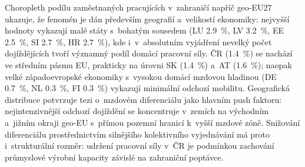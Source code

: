 Choropleth podílu zaměstnaných pracujících v~zahraničí napříč \acs{geo-EU}27 ukazuje, že fenomén je dán především geografií a~velikostí ekonomiky: nejvyšší hodnoty vykazují malé státy s~bohatým sousedem (LU \SI{2,9}{\percent}, LV \SI{3,2}{\percent}, EE \SI{2,5}{\percent}, SI \SI{2,7}{\percent}, HR \SI{2,7}{\percent}), kde i~v~absolutním vyjádření nevelký počet dojíždějících tvoří významný podíl domácí pracovní síly.
ČR (\SI{1,4}{\percent}) se nachází ve středním pásmu EU, prakticky na úrovni SK (\SI{1,4}{\percent}) a~AT (\SI{1,6}{\percent}); naopak velké západoevropské ekonomiky s~vysokou domácí mzdovou hladinou (DE \SI{0,7}{\percent}, NL \SI{0,3}{\percent}, FI \SI{0,3}{\percent}) vykazují minimální odchozí mobilitu.
Geografická distribuce potvrzuje tezi o~mzdovém diferenciálu jako hlavním push faktoru: nejintenzivnější odchozí dojíždění se koncentruje v~zemích na východním a~jižním okraji \acs{geo-EU} s~přímou pozemní hranicí k~vyšší mzdové zóně.
Snižování diferenciálu prostřednictvím silnějšího kolektivního vyjednávání má proto i~strukturální rozměr: udržení pracovní síly v~ČR je podmínkou zachování průmyslové výrobní kapacity závislé na zahraniční poptávce.


